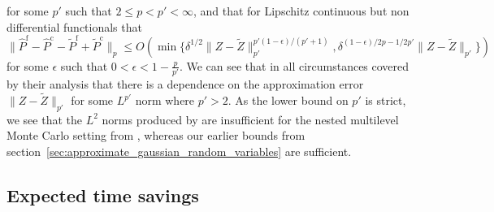 \documentclass[manuscript,review]{acmart}
\begin{document}
for some  $ p' $ such that $ 2 \leq p < p' < \infty $, and that for Lipschitz continuous but non differential functionals that 
\begin{equation*}
\lVert \widehat{P}^{\mathrm{f}} - \widehat{P}^{\mathrm{c}} - \widetilde{P}^{\mathrm{f}} + \widetilde{P}^{\mathrm{c}}\rVert_p 
\leq O(\min\{
\delta^{1/2} \lVert Z - \widetilde{Z} \rVert_{p'}^{p'(1-\epsilon)/(p'+1)},
\delta^{(1-\epsilon)/2p -1/2p'}    \lVert Z - \widetilde{Z} \rVert_{p'}
\})
\end{equation*}
for some  $ \epsilon $ such that $ 0<\epsilon<1 - \tfrac{p}{p'} $. We can see that in all circumstances covered by their analysis that there is a dependence on the approximation error $  \lVert Z - \widetilde{Z} \rVert_{p'} $ for some $ L^{p'} $ norm where $ p' > 2 $. As the lower bound on $ p' $ is strict, we see that the $ L^2 $ norms produced by \citet{giles2019random_quadrature} are insufficient for the nested multilevel Monte Carlo setting from \citet{giles2020approximate}, whereas our earlier bounds from section~\ref{sec:approximate_gaussian_random_variables} are sufficient. 

\subsection{Expected time savings}
\end{document}
